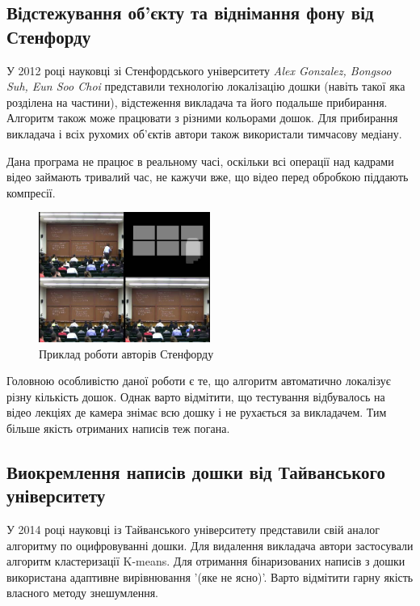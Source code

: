 \subsection{Відстежування об'єкту та віднімання фону від Стенфорду}

У 2012 році науковці зі Стенфордського університету \textit{Alex Gonzalez, 
Bongsoo Suh, Eun Soo Choi} представили технологію \cite{sah} локалізацію дошки
(навіть такої яка розділена на частини), відстеження викладача та його
подальше прибирання. Алгоритм також може працювати з різними кольорами
дошок. Для прибирання викладача і всіх рухомих об'єктів автори також 
використали тимчасову медіану.

Дана програма не працює в реальному часі, оскільки всі операції над кадрами
відео займають тривалий час, не кажучи вже, що відео перед обробкою 
піддають компресії.

\begin{figure}[h]
  \centering
  \includegraphics[width=0.5\textwidth]{images/sah}
  \caption{Приклад роботи авторів Стенфорду}
  \label{fig:sah}
\end{figure}

Головною особливістю даної роботи є те, що  алгоритм автоматично локалізує 
різну кількість дошок. Однак варто відмітити, що тестування відбувалось на
відео лекціях де камера знімає всю дошку і не рухається за викладачем. Тим більше
якість отриманих написів теж погана.

\subsection{Виокремлення написів дошки від Тайванського університету}

У 2014 році науковці із Тайванського університету представили свій аналог \cite{yeh} 
алгоритму по оцифровуванні дошки. Для видалення викладача автори застосували 
алгоритм кластеризації K-means. Для отримання бінаризованих написів з дошки 
використана адаптивне вирівнювання '(яке не ясно)'. Варто відмітити гарну
якість власного методу знешумлення.

